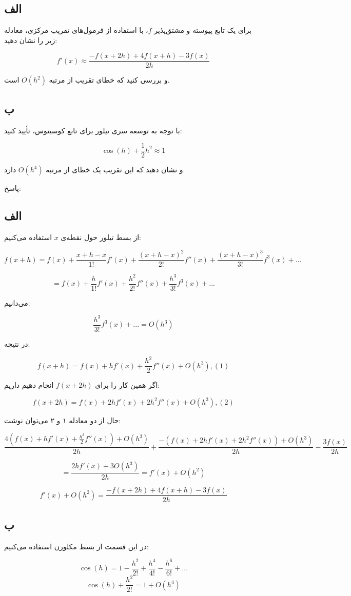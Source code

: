 \subsection*{الف}

برای یک تابع پیوسته و مشتق‌پذیر \( f \)، با استفاده از فرمول‌های تقریب مرکزی، معادله زیر را نشان دهید:

\[ f'(x) \approx \frac{-f(x + 2h) + 4f(x + h) - 3f(x)}{2h} \]

و بررسی کنید که خطای تقریب از مرتبه \( O(h^2) \) است.

\subsection*{ب}

با توجه به توسعه سری تیلور برای تابع کوسینوس، تأیید کنید:

\[ \cos(h) + \frac{1}{2} h^2 \approx 1 \]

و نشان دهید که این تقریب یک خطای از مرتبه \( O(h^4) \) دارد.

پاسخ:


    \subsection*{الف}
    از بسط تیلور حول نقطه‌ی $x$ استفاده می‌کنیم:
    
    $$f(x + h ) = f(x) + \frac{x + h - x}{1!}f'(x) + \frac{(x + h - x)^{2}}{2!}f''(x) + \frac{(x + h - x)^{3}}{3!}f^{3}(x) + ...$$
    
    $$= f(x) + \frac{h}{1!}f'(x) + \frac{h^{2}}{2!}f''(x) + \frac{h^{3}}{3!}f^{3}(x) + ... $$
    
    می‌دانیم: 
    
    $$\frac{h^{3}}{3!}f^{3}(x) + ... = O(h^{3})$$
    
    در نتیجه:
    
    $$f(x + h) = f(x) + hf'(x) + \frac{h^{2}}{2}f''(x) + O(h^{3}),  (1)$$
    
    اگر همین کار را برای $f(x + 2h)$ انجام دهیم داریم:
    
    
    $$f(x + 2h) = f(x) + 2hf'(x) + 2h^{2}f''(x) + O(h^{3}), (2)$$
    
    حال از دو معادله ۱ و ۲ می‌توان نوشت:
    
    $$\frac{4(f(x) + hf'(x) + \frac{h^{2}}{2}f''(x)) + O(h^{3})}{2h} + \frac{-(f(x) + 2hf'(x) + 2h^{2}f''(x)) + O(h^{3})}{2h} - \frac{3f(x)}{2h}$$
    
    
    $$= \frac{2hf'(x) + 3O(h^{3})}{2h} = f'(x) + O(h^{2})$$
    
    
    $$f'(x) + O(h^{2}) = \frac{-f(x + 2h) + 4f(x + h) - 3f(x)}{2h}$$
    
    
    \subsection*{ب}
    در این قسمت از بسط مکلورن استفاده می‌کنیم:
    
    $$\cos(h) = 1 - \frac{h^{2}}{2!} + \frac{h^{4}}{4!} - \frac{h^{6}}{6!} + ...$$
    $$\cos(h) + \frac{h^{2}}{2!} = 1 + O(h^{4})$$



